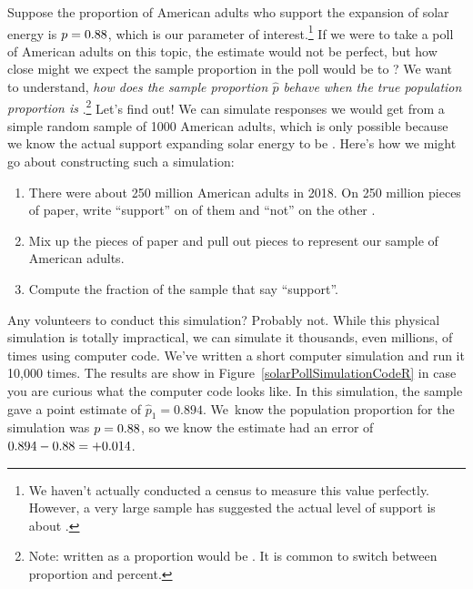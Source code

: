 Suppose the proportion of American adults who support
the expansion of solar energy is $p = 0.88{}$,
which is our parameter of interest.\footnote{We haven't
  actually conducted a census to measure this value perfectly.
  However, a very large sample has suggested the actual
  level of support is about \pewsolarparpercent{}.}
If we were to take a poll of \pewsolarpollsize{} American adults
on this topic, the estimate would not be perfect,
but how close might we expect the sample proportion
in the poll would be to \pewsolarparpercent{}?
We want to understand, \emph{how does the
sample proportion $\hat{p}$ behave when the true population
proportion is \pewsolarparprop{}}.\footnote{Note:
  \pewsolarparpercent{} written as a proportion would be
  \pewsolarparprop{}.
  It is common to switch between proportion and percent.}
Let's find out!
We can simulate responses we would get from a simple
random sample of 1000 American adults,
which is only possible because we know the actual
support expanding solar energy to be \pewsolarparprop{}.  Here's how we might go about constructing such a simulation:
\begin{enumerate}
\item There were about 250 million American adults in 2018.
    On 250 million pieces of paper, write ``support''
    on \pewsolarparpercent{} of them and ``not'' on
    the other \pewsolarparpercentcomplement{}.
\item Mix up the pieces of paper and pull out \pewsolarpollsize{}
    pieces to represent our sample of \pewsolarpollsize{}
    American adults.
\item Compute the fraction of the sample that say ``support''.
\end{enumerate}
Any volunteers to conduct this simulation? Probably not. While this physical simulation is totally impractical, we can simulate it thousands, even millions, of times using computer code.  We've written a short computer simulation and run it 10,000 times.  The results are show in 
Figure~\ref{solarPollSimulationCodeR}
in case you are curious what the computer code looks like.
In this simulation, the sample gave a point estimate of
$\hat{p}_1 = 0.894$. We~know the population proportion
for the simulation was $p = 0.88{}$, so we know
the estimate had an error of
$0.894 - 0.88{} = \text{+0.014}$.\D{\vspace{10mm}\\\ }


